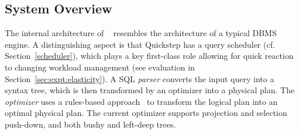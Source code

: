 


\subsection{System Overview} \label{overview}
The internal architecture of \Quickstep\ %
resembles the architecture of a typical DBMS engine. A distinguishing aspect is that Quickstep has a query scheduler (cf. Section~\ref{scheduler}), which plays a key first-class role allowing for quick reaction to changing workload management (see evaluation in Section~\ref{sec:expt:elasticity}). A SQL \textit{parser} converts the input query into a syntax tree, which is then transformed by an optimizer into a physical plan. The \textit{optimizer} %
uses a rules-based approach~\cite{Volcano} to transform the logical plan into an optimal physical plan. %
The current optimizer %
supports projection and selection push-down, and both bushy and left-deep trees. 


